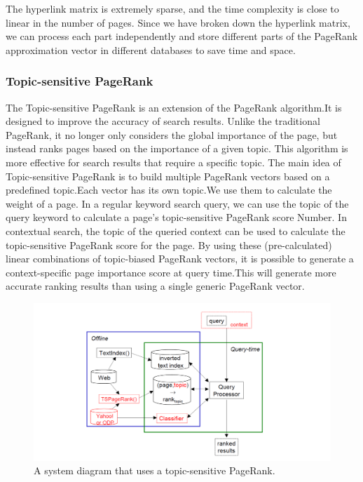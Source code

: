 \documentclass[lettersize,journal,12pt,conference]{IEEEtran}
\begin{document}
The hyperlink matrix is extremely sparse, and the time complexity is close to linear in the number of pages. Since we have broken down the hyperlink matrix, we can process each part independently and store different parts of the PageRank approximation vector in different databases to save time and space.



\subsubsection{ Topic-sensitive PageRank}

The Topic-sensitive PageRank is an extension of the PageRank algorithm.It is designed to improve the accuracy of search results. Unlike the traditional PageRank, it no longer only considers the global importance of the page, but instead ranks pages based on the importance of a given topic. This algorithm is more effective for search results that require a specific topic.
The main idea of Topic-sensitive PageRank is to build multiple PageRank vectors based on a predefined topic.Each vector has its own topic.We use them to calculate the weight of a page. In a regular keyword search query, we can use the topic of the query keyword to calculate a page's topic-sensitive PageRank score Number. In contextual search, the topic of the queried context can be used to calculate the topic-sensitive PageRank score for the page. By using these (pre-calculated) linear combinations of topic-biased PageRank vectors, it is possible to generate a context-specific page importance score at query time.This will generate more accurate ranking results than using a single generic PageRank vector.
\begin{figure}[!t]
	\centering
	\includegraphics[width=\textwidth]{images/fig4.png}
	\caption{A system diagram that uses a topic-sensitive PageRank.}
	\label{fig5}
\end{figure}
\end{document}
